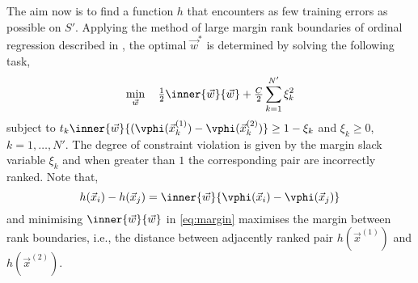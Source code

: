 The aim now is to find a function $h$ that encounters as few training errors as possible on $S'$. Applying the method of large margin rank boundaries of ordinal regression described in \cite{Herbrich00}, the optimal $\vec{w}^*$ is determined by solving the following task, 
\begin{equation}\label{eq:margin}
	\min_{\vec{w}}\quad \tfrac{1}{2}\inner{\vec{w}}{\vec{w}} + \tfrac{C}{2}\sum_{k=1}^{N'}\xi_k^2
\end{equation}
subject to $t_k\inner{\vec{w}}{(\vphi(\vec{x}_k^{(1)})-\vphi(\vec{x}_k^{(2)})}\ge 1 - \xi_k$ and $\xi_k \ge 0$, $k = 1,\ldots, N'$. The degree of constraint violation is given by the margin slack variable $\xi_k$ and when greater than $1$ the corresponding pair are incorrectly ranked. 
Note that,
\begin{equation}
	h(\vec{x}_i)-h(\vec{x}_j)=\inner{\vec{w}}{\vphi(\vec{x}_i)-\vphi(\vec{x}_j)}
\end{equation}
and minimising $\inner{\vec{w}}{\vec{w}}$ in \cref{eq:margin} maximises the margin between rank boundaries, i.e., the distance between adjacently ranked pair $h(\vec{x}^{(1)})$ and $h(\vec{x}^{(2)})$.





